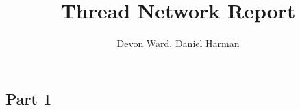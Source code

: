 \documentclass[letterpaper,twocolumn,10pt]{article}
\title{Thread Network Report}
\author{Devon Ward, Daniel Harman}
\begin{document}
\maketitle

\subsection*{Part 1}
\end{document}
